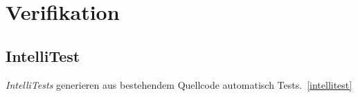 %
\section{Verifikation}

\subsection{IntelliTest}
\emph{IntelliTests} generieren aus bestehendem Quellcode automatisch Tests.~\ref{intellitest}
